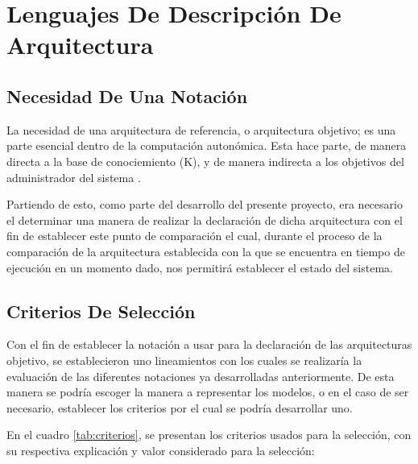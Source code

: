 \chapter{Lenguajes De Descripción De Arquitectura}

\section{Necesidad De Una Notación}

La necesidad de una arquitectura de referencia, o arquitectura objetivo; es una parte esencial dentro de la computación autonómica. Esta hace parte, de manera directa a la base de conociemiento (K), y de manera indirecta a los objetivos del administrador del sistema \cite[p. 24]{lalanda_diaconescu_mccann_2014}. 

Partiendo de esto, como parte del desarrollo del presente proyecto, era necesario el determinar una manera de realizar la declaración de dicha arquitectura con el fin de establecer este punto de comparación el cual, durante el proceso de la comparación de la arquitectura establecida con la que se encuentra en tiempo de ejecución en un momento dado, nos permitirá establecer el estado del sistema.

\section{Criterios De Selección}

Con el fin de establecer la notación a usar para la declaración de las arquitecturas objetivo, se establecieron uno lineamientos con los cuales se realizaría la evaluación de las diferentes notaciones ya desarrolladas anteriormente. De esta manera se podría escoger la manera a representar los modelos, o en el caso de ser necesario, establecer los criterios por el cual se podría desarrollar uno.

En el cuadro \ref{tab:criterios}, se presentan los criterios usados para la selección, con su respectiva explicación y valor considerado para la selección:

